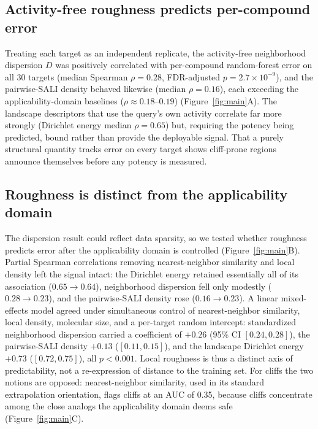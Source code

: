 \documentclass[11pt,letterpaper]{article}
\begin{document}
\subsection*{Activity-free roughness predicts per-compound error}
Treating each target as an independent replicate, the activity-free neighborhood dispersion $D$ was positively correlated with per-compound random-forest error on all 30 targets (median Spearman $\rho = 0.28$, FDR-adjusted $p = 2.7 \times 10^{-9}$), and the pairwise-SALI density behaved likewise (median $\rho = 0.16$), each exceeding the applicability-domain baselines ($\rho \approx 0.18$--$0.19$) (Figure~\ref{fig:main}A). The landscape descriptors that use the query's own activity correlate far more strongly (Dirichlet energy median $\rho = 0.65$) but, requiring the potency being predicted, bound rather than provide the deployable signal. That a purely structural quantity tracks error on every target shows cliff-prone regions announce themselves before any potency is measured.

\subsection*{Roughness is distinct from the applicability domain}
The dispersion result could reflect data sparsity, so we tested whether roughness predicts error after the applicability domain is controlled (Figure~\ref{fig:main}B). Partial Spearman correlations removing nearest-neighbor similarity and local density left the signal intact: the Dirichlet energy retained essentially all of its association ($0.65 \rightarrow 0.64$), neighborhood dispersion fell only modestly ($0.28 \rightarrow 0.23$), and the pairwise-SALI density rose ($0.16 \rightarrow 0.23$). A linear mixed-effects model agreed under simultaneous control of nearest-neighbor similarity, local density, molecular size, and a per-target random intercept: standardized neighborhood dispersion carried a coefficient of $+0.26$ (95\% CI $[0.24, 0.28]$), the pairwise-SALI density $+0.13$ ($[0.11, 0.15]$), and the landscape Dirichlet energy $+0.73$ ($[0.72, 0.75]$), all $p < 0.001$. Local roughness is thus a distinct axis of predictability, not a re-expression of distance to the training set. For cliffs the two notions are opposed: nearest-neighbor similarity, used in its standard extrapolation orientation, flags cliffs at an AUC of 0.35, because cliffs concentrate among the close analogs the applicability domain deems safe (Figure~\ref{fig:main}C).
\end{document}
